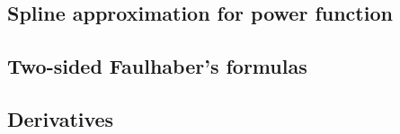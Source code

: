 \subsection{Spline approximation for power function}
\label{subsec:spline-approximation-for-power-function}


\subsection{Two-sided Faulhaber's formulas}
\label{subsec:two-sided-faulhaber's-formulas}


\subsection{Derivatives}
\label{subsec:derivatives}

